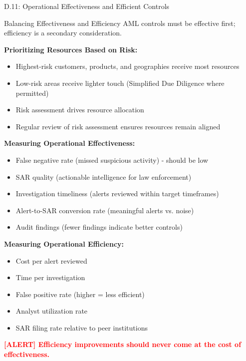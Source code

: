 \documentclass[11pt,a4paper]{beamer}
\newcommand{\redflag}[1]{\textcolor{red}{\textbf{[ALERT] #1}}}
\begin{document}
\begin{frame}{D.11: Operational Effectiveness and Efficient Controls}
	\begin{block}{Balancing Effectiveness and Efficiency}
		AML controls must be effective first; efficiency is a secondary consideration.
	\end{block}
	\textbf{Prioritizing Resources Based on Risk:}
	\begin{itemize}
		\item Highest-risk customers, products, and geographies receive most resources
		\item Low-risk areas receive lighter touch (Simplified Due Diligence where permitted)
		\item Risk assessment drives resource allocation
		\item Regular review of risk assessment ensures resources remain aligned
	\end{itemize}
	\textbf{Measuring Operational Effectiveness:}
	\begin{itemize}
		\item False negative rate (missed suspicious activity) - should be low
		\item SAR quality (actionable intelligence for law enforcement)
		\item Investigation timeliness (alerts reviewed within target timeframes)
		\item Alert-to-SAR conversion rate (meaningful alerts vs. noise)
		\item Audit findings (fewer findings indicate better controls)
	\end{itemize}
	\textbf{Measuring Operational Efficiency:}
	\begin{itemize}
		\item Cost per alert reviewed
		\item Time per investigation
		\item False positive rate (higher = less efficient)
		\item Analyst utilization rate
		\item SAR filing rate relative to peer institutions
	\end{itemize}
	\redflag{Efficiency improvements should never come at the cost of effectiveness.}
\end{frame}
\end{document}
